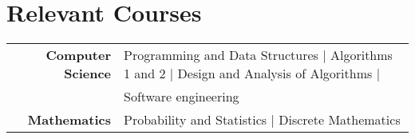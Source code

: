 \documentclass[a4paper,10pt]{article} %
\begin{document}

\section{\textcolor{sectiontitle}{Relevant Courses}}
\begin{tabular}{r|l}
\textbf{Computer Science} & Programming and Data Structures | Algorithms 1 and 2 | Design and Analysis of Algorithms |\\
& Software engineering\\
\textbf{Mathematics} & Probability and Statistics | Discrete  Mathematics\\
\end{tabular}
\end{document}
